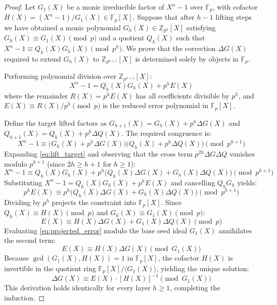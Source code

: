 \documentclass[12pt]{article}
\theoremstyle{plain}
\begin{document}
\begin{proof}
Let $G_1(X)$ be a monic irreducible factor of $X^n-1$ over $\mathbb{F}_p$, with cofactor $H(X) = (X^n-1)/G_1(X) \in \mathbb{F}_p[X]$. Suppose that after $h-1$ lifting steps we have obtained a monic polynomial $G_h(X) \in \mathbb{Z}_{p^h}[X]$ satisfying $G_h(X) \equiv G_1(X) \pmod p$ and a quotient $Q_h(X)$ such that $X^n - 1 \equiv Q_h(X) G_h(X) \pmod{p^h}$. We prove that the correction $\Delta G(X)$ required to extend $G_h(X)$ to $\mathbb{Z}_{p^{h+1}}[X]$ is determined solely by objects in $\mathbb{F}_p$.

Performing polynomial division over $\mathbb{Z}_{p^{h+1}}[X]$:
\begin{equation}
    X^n - 1 = Q_h(X) G_h(X) + p^h E(X)
\end{equation}
where the remainder $R(X) = p^h E(X)$ has all coefficients divisible by $p^h$, and $E(X) \equiv R(X)/p^h \pmod p$ is the reduced error polynomial in $\mathbb{F}_p[X]$.

Define the target lifted factors as $G_{h+1}(X) = G_h(X) + p^h \Delta G(X)$ and $Q_{h+1}(X) = Q_h(X) + p^h \Delta Q(X)$. The required congruence is:
\begin{equation} \label{eq:lift_target}
    X^n - 1 \equiv \big(G_h(X) + p^h \Delta G(X)\big)\big(Q_h(X) + p^h \Delta Q(X)\big) \pmod{p^{h+1}}
\end{equation}
Expanding \eqref{eq:lift_target} and observing that the cross term $p^{2h} \Delta G \Delta Q$ vanishes modulo $p^{h+1}$ (since $2h \geq h+1$ for $h \geq 1$):
\begin{equation} \label{eq:lift_expanded}
    X^n - 1 \equiv Q_h(X) G_h(X) + p^h \big(Q_h(X) \Delta G(X) + G_h(X) \Delta Q(X)\big) \pmod{p^{h+1}}
\end{equation}
Substituting $X^n - 1 = Q_h(X) G_h(X) + p^h E(X)$ and cancelling $Q_h G_h$ yields:
\begin{equation}
    p^h E(X) \equiv p^h \big(Q_h(X) \Delta G(X) + G_h(X) \Delta Q(X)\big) \pmod{p^{h+1}}
\end{equation}
Dividing by $p^h$ projects the constraint into $\mathbb{F}_p[X]$. Since $Q_h(X) \equiv H(X) \pmod p$ and $G_h(X) \equiv G_1(X) \pmod p$:
\begin{equation} \label{eq:projected_error}
    E(X) \equiv H(X) \Delta G(X) + G_1(X) \Delta Q(X) \pmod p
\end{equation}
Evaluating \eqref{eq:projected_error} modulo the base seed ideal $G_1(X)$ annihilates the second term:
\begin{equation}
    E(X) \equiv H(X) \Delta G(X) \pmod{G_1(X)}
\end{equation}
Because $\gcd(G_1(X), H(X)) = 1$ in $\mathbb{F}_p[X]$, the cofactor $H(X)$ is invertible in the quotient ring $\mathbb{F}_p[X]/\langle G_1(X) \rangle$, yielding the unique solution:
\begin{equation}
    \Delta G(X) \equiv E(X) \cdot [H(X)]^{-1} \pmod{G_1(X)}
\end{equation}
This derivation holds identically for every layer $h \geq 1$, completing the induction.
\end{proof}
\end{document}
